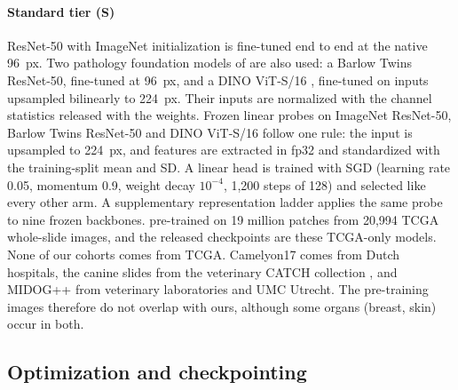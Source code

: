 \paragraph{Standard tier (S)} ResNet-50 \citep{he2016resnet} with ImageNet
initialization \citep{deng2009imagenet} is fine-tuned end to end at the native
96~px. Two pathology foundation models of \citet{kang2023benchmarking} are also
used: a Barlow Twins ResNet-50, fine-tuned at 96~px, and a DINO ViT-S/16
\citep{dosovitskiy2021vit}, fine-tuned on inputs upsampled bilinearly to
224~px. Their inputs are normalized with the channel statistics released with
the weights. Frozen linear probes on ImageNet ResNet-50, Barlow Twins ResNet-50
and DINO ViT-S/16 follow one rule: the input is upsampled to 224~px, and
features are extracted in fp32 and standardized with the training-split mean
and SD. A linear head is trained with SGD (learning rate 0.05, momentum 0.9,
weight decay $10^{-4}$, 1,200 steps of 128) and selected like every other arm.
A supplementary representation ladder applies the same probe to nine frozen
backbones. \citet{kang2023benchmarking} pre-trained on 19 million patches from
20,994 TCGA whole-slide images, and the released checkpoints are these
TCGA-only models. None of our cohorts comes from TCGA. Camelyon17 comes
from Dutch hospitals, the canine slides from the veterinary CATCH collection
\citep{wilm2023canine}, and
MIDOG++ from veterinary laboratories and UMC Utrecht. The pre-training images
therefore do not overlap with ours, although some organs (breast, skin) occur in
both.

\subsection{Optimization and checkpointing}
\label{sec:setup-optim}

